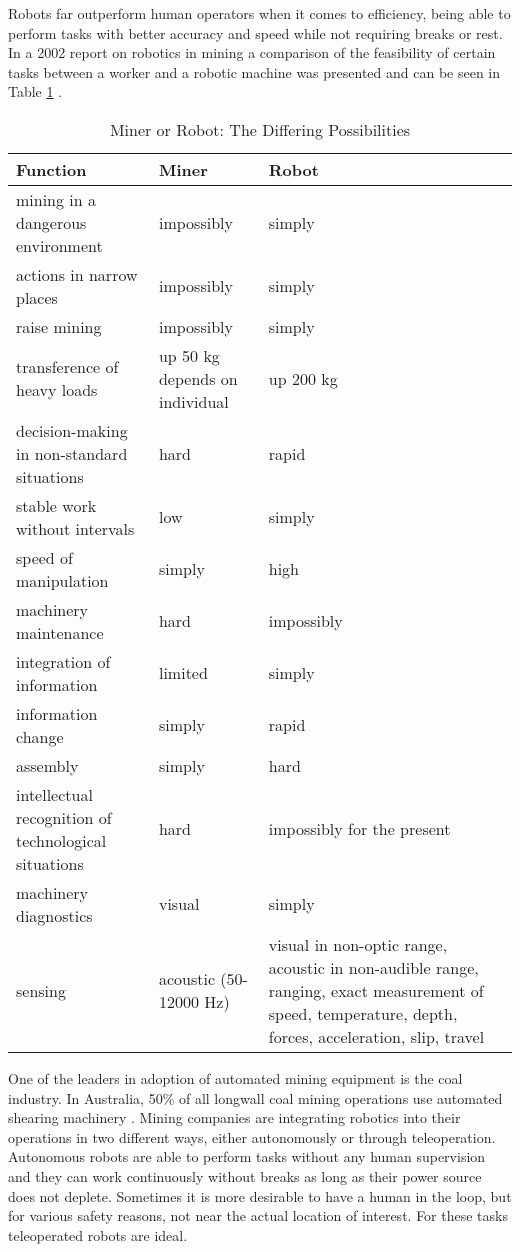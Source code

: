 Robots far outperform human operators when it comes to efficiency, being able to perform tasks with better accuracy and speed while not requiring breaks or rest. In a 2002 report on robotics in mining a comparison of the feasibility of certain tasks between a worker and a robotic machine was presented and can be seen in Table \ref{tab:table} \cite{table}.\\
\begin{center}
\begin{table}[ht!]
\caption[]{Miner or Robot: The Differing Possibilities \cite{table}}
\small
\hfill{}
\resizebox{6.5in}{!} {
\begin{tabular}{p{3in} p{2.5in} p{2in} p{3in}}
\toprule
Function & Miner & Robot\\
\midrule
mining in a dangerous environment & impossibly & simply\\
actions in narrow places & impossibly & simply\\
raise mining & impossibly & simply\\
transference of heavy loads & up 50 kg depends on individual & up 200 kg\\
decision-making in non-standard situations & hard & rapid\\
stable work without intervals & low & simply\\
speed of manipulation & simply & high\\
machinery maintenance & hard & impossibly\\
integration of information & limited & simply\\
information change & simply & rapid\\
assembly & simply & hard\\
intellectual recognition of technological situations & hard & impossibly for the present\\
machinery diagnostics & visual & simply\\
sensing & acoustic (50-12000 Hz) & visual in non-optic range, acoustic in non-audible range, ranging, exact measurement of speed, temperature, depth, forces, acceleration, slip, travel\\
\bottomrule
\end{tabular}
}
\hfill{}
\label{tab:table}
\end{table}
\end{center}
One of the leaders in adoption of automated mining equipment is the coal industry. In Australia, 50\% of all longwall coal mining operations use automated shearing machinery \cite{auswall}. Mining companies are integrating robotics into their operations in two different ways, either autonomously or through teleoperation. Autonomous robots are able to perform tasks without any human supervision and they can work continuously without breaks as long as their power source does not deplete. Sometimes it is more desirable to have a human in the loop, but for various safety reasons, not near the actual location of interest. For these tasks teleoperated robots are ideal.\\

